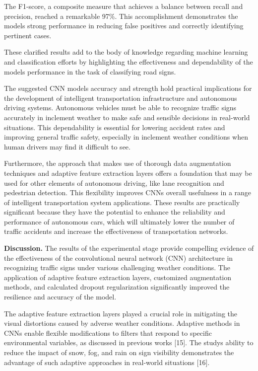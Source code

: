 The F1-score, a composite measure that achieves a balance between recall
and precision, reached a remarkable 97\%. This accomplishment
demonstrates the model\textquotesingle s strong performance in reducing
false positives and correctly identifying pertinent cases.

These clarified results add to the body of knowledge regarding machine
learning and classification efforts by highlighting the effectiveness
and dependability of the model\textquotesingle s performance in the task
of classifying road signs.

The suggested CNN model\textquotesingle s accuracy and strength hold
practical implications for the development of intelligent transportation
infrastructure and autonomous driving systems. Autonomous vehicles must
be able to recognize traffic signs accurately in inclement weather to
make safe and sensible decisions in real-world situations. This
dependability is essential for lowering accident rates and improving
general traffic safety, especially in inclement weather conditions when
human drivers may find it difficult to see.

Furthermore, the approach that makes use of thorough data augmentation
techniques and adaptive feature extraction layers offers a foundation
that may be used for other elements of autonomous driving, like lane
recognition and pedestrian detection. This flexibility improves
CNNs\textquotesingle{} overall usefulness in a range of intelligent
transportation system applications. These results are practically
significant because they have the potential to enhance the reliability
and performance of autonomous cars, which will ultimately lower the
number of traffic accidents and increase the effectiveness of
transportation networks.

\textbf{Discussion.} The results of the experimental stage provide
compelling evidence of the effectiveness of the convolutional neural
network (CNN) architecture in recognizing traffic signs under various
challenging weather conditions. The application of adaptive feature
extraction layers, customized augmentation methods, and calculated
dropout regularization significantly improved the resilience and
accuracy of the model.

The adaptive feature extraction layers played a crucial role in
mitigating the visual distortions caused by adverse weather conditions.
Adaptive methods in CNNs enable flexible modifications to filters that
respond to specific environmental variables, as discussed in previous
works {[}15{]}. The study\textquotesingle s ability to reduce the impact
of snow, fog, and rain on sign visibility demonstrates the advantage of
such adaptive approaches in real-world situations {[}16{]}.

